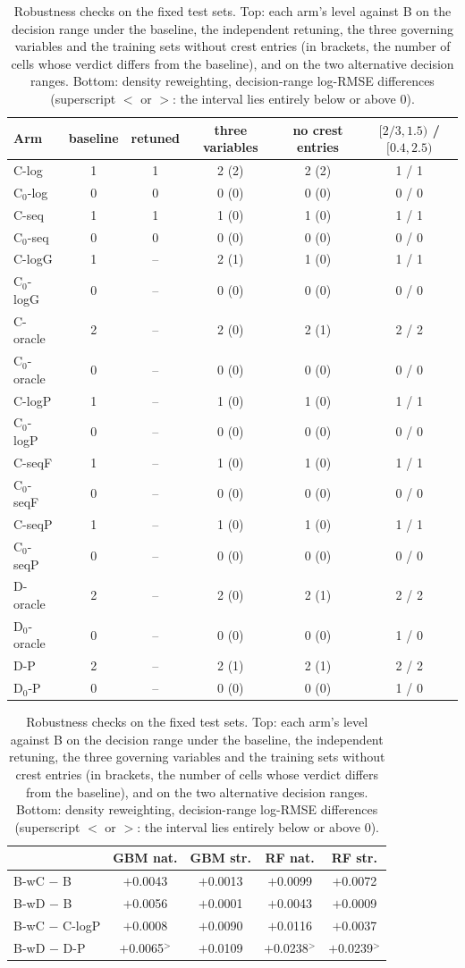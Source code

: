 \begin{table}[htbp]
\centering
\small
\caption{Robustness checks on the fixed test sets. Top: each arm's level against B on the decision range under the baseline, the independent retuning, the three governing variables and the training sets without crest entries (in brackets, the number of cells whose verdict differs from the baseline), and on the two alternative decision ranges. Bottom: density reweighting, decision-range log-RMSE differences (superscript $<$ or $>$: the interval lies entirely below or above 0).}
\label{tab:rev:robustness}
\begin{tabular}{lccccc}
\toprule
Arm & baseline & retuned & three variables & no crest entries & $[2/3, 1.5)$ / $[0.4, 2.5)$ \\
\midrule
C-log & 1 & 1 & 2 (2) & 2 (2) & 1 / 1 \\
C$_0$-log & 0 & 0 & 0 (0) & 0 (0) & 0 / 0 \\
C-seq & 1 & 1 & 1 (0) & 1 (0) & 1 / 1 \\
C$_0$-seq & 0 & 0 & 0 (0) & 0 (0) & 0 / 0 \\
C-logG & 1 & -- & 2 (1) & 1 (0) & 1 / 1 \\
C$_0$-logG & 0 & -- & 0 (0) & 0 (0) & 0 / 0 \\
C-oracle & 2 & -- & 2 (0) & 2 (1) & 2 / 2 \\
C$_0$-oracle & 0 & -- & 0 (0) & 0 (0) & 0 / 0 \\
C-logP & 1 & -- & 1 (0) & 1 (0) & 1 / 1 \\
C$_0$-logP & 0 & -- & 0 (0) & 0 (0) & 0 / 0 \\
C-seqF & 1 & -- & 1 (0) & 1 (0) & 1 / 1 \\
C$_0$-seqF & 0 & -- & 0 (0) & 0 (0) & 0 / 0 \\
C-seqP & 1 & -- & 1 (0) & 1 (0) & 1 / 1 \\
C$_0$-seqP & 0 & -- & 0 (0) & 0 (0) & 0 / 0 \\
D-oracle & 2 & -- & 2 (0) & 2 (1) & 2 / 2 \\
D$_0$-oracle & 0 & -- & 0 (0) & 0 (0) & 1 / 0 \\
D-P & 2 & -- & 2 (1) & 2 (1) & 2 / 2 \\
D$_0$-P & 0 & -- & 0 (0) & 0 (0) & 1 / 0 \\
\bottomrule
\end{tabular}
\par\medskip
\begin{tabular}{lcccc}
\toprule
 & GBM nat. & GBM str. & RF nat. & RF str. \\
\midrule
B-wC $-$ B & $+$0.0043 & $+$0.0013 & $+$0.0099 & $+$0.0072 \\
B-wD $-$ B & $+$0.0056 & $+$0.0001 & $+$0.0043 & $+$0.0009 \\
B-wC $-$ C-logP & $+$0.0008 & $+$0.0090 & $+$0.0116 & $+$0.0037 \\
B-wD $-$ D-P & $+$0.0065$^{>}$ & $+$0.0109 & $+$0.0238$^{>}$ & $+$0.0239$^{>}$ \\
\bottomrule
\end{tabular}
\end{table}
